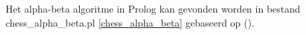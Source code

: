\documentclass[a4paper,10pt]{article}
\begin{document}

Het alpha-beta algoritme in Prolog kan gevonden worden in bestand chess\_alpha\_beta.pl \ref{chess_alpha_beta} gebaseerd op (\cite{alpha-beta}).


\end{document}
